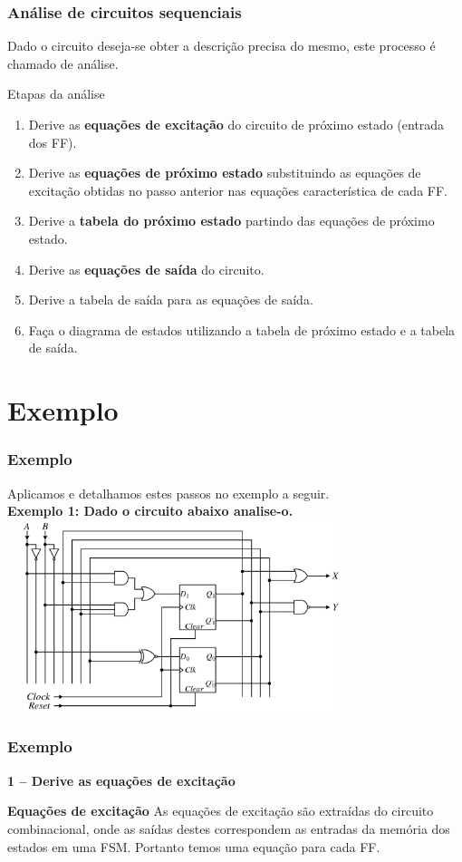 \documentclass{beamer}
\begin{document}
\begin{frame}
  \frametitle{Análise de circuitos sequenciais}
  Dado o circuito deseja-se obter a descrição precisa do mesmo, este processo é chamado de análise.
  \begin{block}{Etapas da análise}
   \begin{enumerate}
    \item Derive as \textbf{equações de excitação} do circuito de próximo estado (entrada dos FF).\pause
    \item Derive as \textbf{equações de próximo estado} substituindo as equações de excitação obtidas no passo anterior nas equações característica de cada FF.\pause
    \item Derive a \textbf{tabela do próximo estado} partindo das equações de próximo estado.\pause
    \item Derive as \textbf{equações de saída} do circuito.\pause
    \item Derive a tabela de saída para as equações de saída.\pause
    \item Faça o diagrama de estados utilizando a tabela de próximo estado e a tabela de saída.
   \end{enumerate}
  \end{block}
\end{frame}

\section{Exemplo}
\begin{frame}
  \frametitle{Exemplo}
  Aplicamos e detalhamos estes passos no exemplo a seguir.\\
  
  \textbf{Exemplo 1: Dado o circuito abaixo analise-o.}
   \includegraphics[height = 2.2in, width = 4in]{EXEMPLO_ANALISE_1.png}
\end{frame}

\begin{frame}
  \frametitle{Exemplo}
  \textbf{1 – Derive as equações de excitação}
  \begin{block}{\textbf{Equações de excitação}}
   As equações de excitação são extraídas do circuito combinacional, onde as saídas destes correspondem as entradas da memória dos estados em uma FSM. 
   Portanto temos uma equação para cada FF.
  \end{block}
\end{frame}
\end{document}
